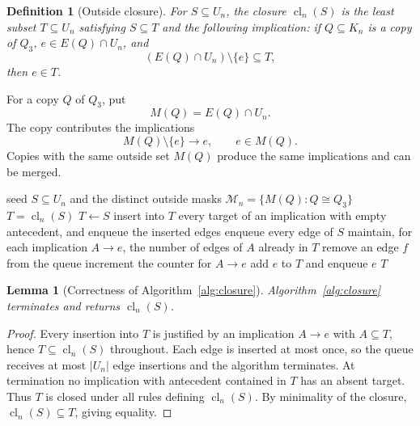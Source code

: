 \documentclass[11pt]{article}
\numberwithin{equation}{section}
\newtheorem{lemma}[theorem]{Lemma}
\newtheorem{definition}[theorem]{Definition}
\newcommand{\cl}{\operatorname{cl}}
\begin{document}
\begin{definition}[Outside closure]\label{def:closure}
For $S\subseteq U_n$, the closure $\cl_n(S)$ is the least subset $T\subseteq U_n$ satisfying $S\subseteq T$ and the following implication: if $Q\subseteq K_n$ is a copy of $Q_3$, $e\in E(Q)\cap U_n$, and
\[
(E(Q)\cap U_n)\setminus\{e\}\subseteq T,
\]
then $e\in T$.
\end{definition}

For a copy $Q$ of $Q_3$, put
\[
M(Q)=E(Q)\cap U_n.
\]
The copy contributes the implications
\[
M(Q)\setminus\{e\}\longrightarrow e,
\qquad e\in M(Q).
\tag{3.2}
\]
Copies with the same outside set $M(Q)$ produce the same implications and can be merged.

\begin{algorithm}[t]
\caption{Exact closure computation}
\label{alg:closure}
\begin{algorithmic}[1]
\Require seed $S\subseteq U_n$ and the distinct outside masks $\mathcal M_n=\{M(Q):Q\cong Q_3\}$
\Ensure $T=\cl_n(S)$
\State $T\gets S$
\State insert into $T$ every target of an implication with empty antecedent, and enqueue the inserted edges
\State enqueue every edge of $S$
\State maintain, for each implication $A\to e$, the number of edges of $A$ already in $T$
    \State remove an edge $f$ from the queue
        \State increment the counter for $A\to e$
            \State add $e$ to $T$ and enqueue $e$
        \EndIf
    \EndFor
\EndWhile
\State \Return $T$
\end{algorithmic}
\end{algorithm}

\begin{lemma}[Correctness of Algorithm~\ref{alg:closure}]
Algorithm~\ref{alg:closure} terminates and returns $\cl_n(S)$.
\end{lemma}

\begin{proof}
Every insertion into $T$ is justified by an implication $A\to e$ with $A\subseteq T$, hence $T\subseteq\cl_n(S)$ throughout. Each edge is inserted at most once, so the queue receives at most $|U_n|$ edge insertions and the algorithm terminates. At termination no implication with antecedent contained in $T$ has an absent target. Thus $T$ is closed under all rules defining $\cl_n(S)$. By minimality of the closure, $\cl_n(S)\subseteq T$, giving equality.\end{proof}
\end{document}

